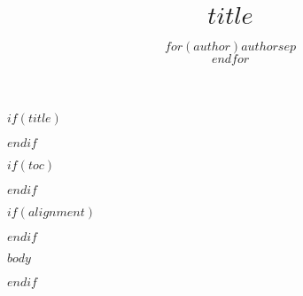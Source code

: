 \documentclass[12pt]{memoir}
\begin{document}
$if(title)$
\title{$title$}
\author{$for(author)$$author$$sep$\\$endfor$}
\date{}


\clearpage
\newpage
\maketitle
\thispagestyle{empty}
\newpage
$endif$

$if(toc)$
\tableofcontents

$endif$

\pagestyle{plain}

$if(alignment)$
\begin{$alignment$}
$endif$

$body$

\end{$alignment$}
$endif$
\end{document}
